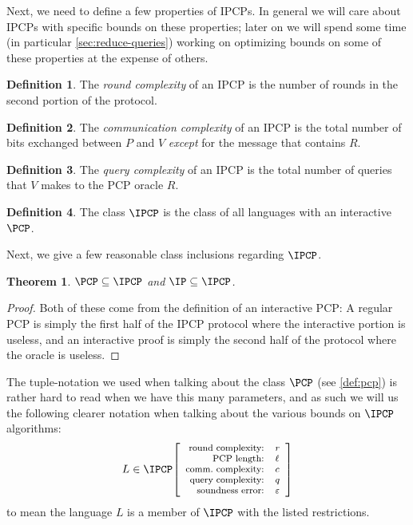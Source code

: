 \documentclass[english,12pt]{reedthesis}
\theoremstyle{plain}
\newtheorem{thm}{Theorem}[section]
\theoremstyle{definition}
\newtheorem{defn}[defn]{Definition}
\theoremstyle{remark}
\newcommand{\ipcp}[5]{%
  \ensuremath%
  \mleft[{\footnotesize\begin{array}{r l}
    \text{round complexity:} & #1 \\
    \text{PCP length:} & #2 \\
    \text{comm.\ complexity:} & #3 \\
    \text{query complexity:} & #4 \\
    \text{soundness error:} & #5
  \end{array}}\mright]%
}
\begin{document}
Next, we need to define a few properties of IPCPs. In general we will care about
IPCPs with specific bounds on these properties; later on we will spend some time
(in particular \cref{sec:reduce-queries}) working on optimizing bounds on some
of these properties at the expense of others.

\begin{defn}\label{def:ipcp-round-complexity}
  The \emph{round complexity} of an IPCP is the number of rounds in the second
  portion of the protocol.
\end{defn}

\begin{defn}\label{def:ipcp-comm-complexity}
  The \emph{communication complexity} of an IPCP is the total number of bits
  exchanged between $P$ and $V$ \emph{except} for the message that contains $R$.
\end{defn}

\begin{defn}
  The \emph{query complexity} of an IPCP is the total number of queries that $V$
  makes to the PCP oracle $R$.
\end{defn}

\begin{defn}\label{def:ipcp-class}
  The class $\IPCP$ is the class of all languages with an interactive $\PCP$.
\end{defn}

Next, we give a few reasonable class inclusions regarding $\IPCP$.

\begin{thm}
  $\PCP \subseteq \IPCP$ and $\IP \subseteq \IPCP$.
\end{thm}

\begin{proof}
  Both of these come from the definition of an interactive PCP: A regular PCP is
  simply the first half of the IPCP protocol where the interactive portion is
  useless, and an interactive proof is simply the second half of the protocol
  where the oracle is useless.
\end{proof}

The tuple-notation we used when talking about the class $\PCP$ (see
\cref{def:pcp}) is rather hard to read when we have this many parameters, and as
such we will us the following clearer notation when talking about the various
bounds on $\IPCP$ algorithms:
\begin{equation*}
  L \in \IPCP\ipcp{r}{\ell}{c}{q}{\varepsilon}
\end{equation*}
to mean the language $L$ is a member of $\IPCP$ with the listed restrictions.
\end{document}
